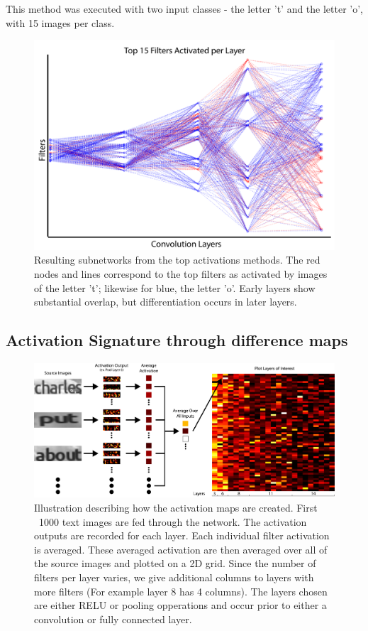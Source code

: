 \documentclass[10pt,twocolumn,letterpaper]{article}
\begin{document}
This method was executed with two input classes - the letter 't' and the letter 'o', with 15 images per class. 


\begin{figure}
\includegraphics[width=\columnwidth]{Figures/max_activations/max_activations-01.png}
\caption{Resulting subnetworks from the top activations methods. The red nodes and lines correspond to the top filters as activated by images of the letter 't'; likewise for blue, the letter 'o'. Early layers show substantial overlap, but differentiation occurs in later layers.}
\label{fig:activationgraph}
\end{figure}


\subsection{Activation Signature through difference maps} \label{sec:subnetwork}
\begin{figure}
\centering
\includegraphics[width=1\textwidth]{Figures/activations_map_overview/act_map_overview-01.png}
\caption{Illustration describing how the activation maps are created. First ~1000 text images are fed through the network. The activation outputs are recorded for each layer. Each individual filter activation is averaged. These averaged activation are then averaged over all of the source images and plotted on a 2D grid. Since the number of filters per layer varies, we give additional columns to layers with more filters (For example layer 8 has 4 columns). The layers chosen are either RELU or pooling opperations and occur prior to either a convolution or fully connected layer.}
\label{fig:subvis}
\end{figure}
\end{document}
